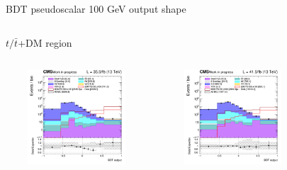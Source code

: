\documentclass[8pt]{beamer}
\begin{document}
\begin{frame}{BDT pseudoscalar 100 GeV output shape}
\begin{columns}
\begin{column}{1.09\textwidth}
\begin{block}{\centering $t/\bar t$+DM region}\end{block} \vspace{10pt}
\end{column}
\end{columns} \vspace{-24pt}
\begin{columns}
		\begin{column}{0.33\textwidth}
			\begin{center}
			\begin{block}{}\end{block}	
     			\includegraphics[width=1.0\textwidth, height=100pt]{figs/2016/SmearSR-ttDM-pseudo100/log_cratio_topCR_ll_ST_BDT_output_pseudoscalar100_customBinsAttempt7.png}
    		\end{center}		
		\end{column} 
		\begin{column}{0.33\textwidth}
			\begin{center}
			\begin{block}{}\end{block}	
     			\includegraphics[width=1.0\textwidth, height=100pt]{figs/2017/SmearSR-ttDM-pseudo100/log_cratio_topCR_ll_ST_BDT_output_pseudoscalar100_customBinsAttempt7.png}
    		\end{center}		
		\end{column} 
		\begin{column}{0.33\textwidth}
			\begin{center}

\end{center}
\end{column}
\end{columns}
\end{frame}
\end{document}
